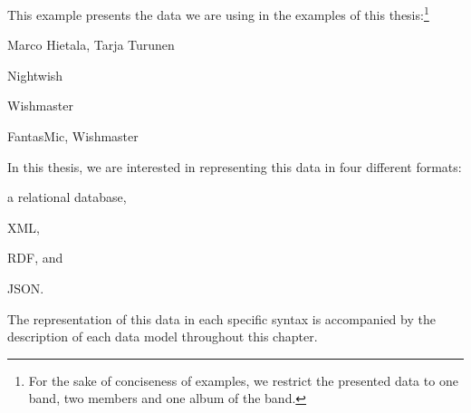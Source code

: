 \begin{example}
  \label{ex:usecase-data}
  This example presents the data we are using in the examples of this thesis:\footnote{For the sake of conciseness of
    examples, we restrict the presented data to one band, two members and one album of the band.}
  \begin{description}[nosep,labelindent=!]
  \item[persons:] Marco Hietala, Tarja Turunen
  \item[bands:] Nightwish
  \item[albums:] Wishmaster
  \item[songs:] FantasMic, Wishmaster%
  \end{description}
  In this thesis, we are interested in representing this data in four different formats:
  \begin{inparaenum}[(i)]
  \item a relational database,
  \item XML,
  \item RDF, and
  \item JSON.
  \end{inparaenum}
  The representation of this data in each specific syntax is accompanied by the description of each data model
  throughout this chapter.
\end{example}




